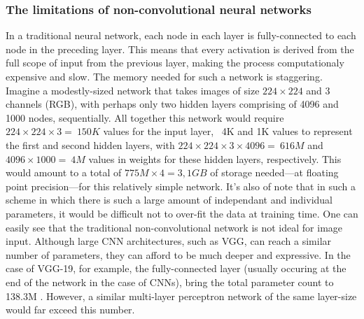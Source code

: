 \subsubsection{The limitations of non-convolutional neural networks}
In a traditional neural network, each node in each layer is fully-connected to each node in the preceding layer. This means that every activation is derived from the full scope of input from the previous layer, making the process computationaly expensive and slow. The memory needed for such a network is staggering. Imagine a modestly-sized network that takes images of size $224\times224$ and 3 channels (RGB), with perhaps only two hidden layers comprising of 4096 and 1000 nodes, sequentially. All together this network would require $224\times224\times3 = ~150K$ values for the input layer, ~4K and 1K values to represent the first and second hidden layers, with $224\times224\times3\times4096 = ~616M$ and $4096\times1000 = ~4M$ values in weights for these hidden layers, respectively. This would amount to a total of $775M\times4 = 3,1 GB$ of storage needed---at floating point precision---for this relatively simple network. It's also of note that in such a scheme in which there is such a large amount of independant and individual parameters, it would be difficult not to over-fit the data at training time. One can easily see that the traditional non-convolutional network is not ideal for image input. Although large CNN architectures, such as VGG, can reach a similar number of parameters, they can afford to be much deeper and expressive. In the case of VGG-19, for example, the fully-connected layer (usually occuring at the end of the network in the case of CNNs), bring the total parameter count to 138.3M \cite{return}. However, a similar multi-layer perceptron network of the same layer-size would far exceed this number.


